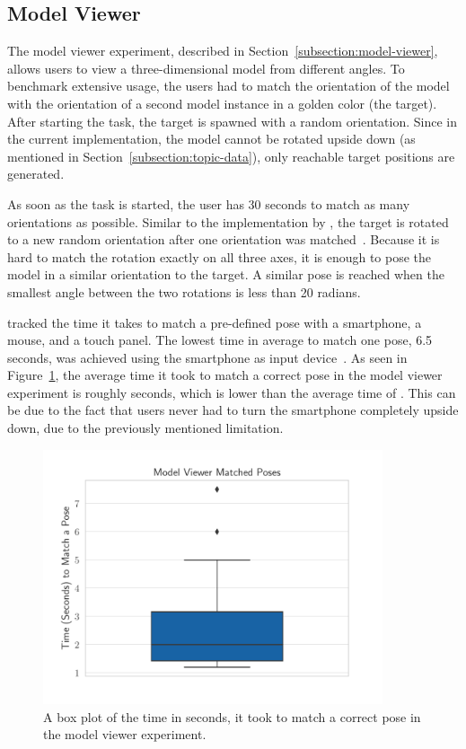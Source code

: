 \subsection{Model Viewer}\label{section:eval-res-mv}

The model viewer experiment, described in Section~\ref{subsection:model-viewer}, allows users to view a three-dimensional model from different angles. To benchmark extensive usage, the users had to match the orientation of the model with the orientation of a second model instance in a golden color (the target). After starting the task, the target is spawned with a random orientation.
Since in the current implementation, the model cannot be rotated upside down (as mentioned in Section~\ref{subsection:topic-data}), only reachable target positions are generated.

As soon as the task is started, the user has 30 seconds to match as many orientations as possible. Similar to the implementation by \citeauthor{Katzakis.2010}, the target is rotated to a new random orientation after one orientation was matched~\cite[140]{Katzakis.2010}.
Because it is hard to match the rotation exactly on all three axes, it is enough to pose the model in a similar orientation to the target. A similar pose is reached when the smallest angle between the two rotations is less than 20 radians.

\citeauthor{Katzakis.2010} tracked the time it takes to match a pre-defined pose with a smartphone, a mouse, and a touch panel. The lowest time in average to match one pose, 6.5 seconds, was achieved using the smartphone as input device~\cite[140]{Katzakis.2010}. As seen in Figure~\ref{fig:eval-exp-mv}, the average time it took to match a correct pose in the model viewer experiment is roughly \evalExpMvAvgPoses{} seconds, which is lower than the average time of \citeauthor{Katzakis.2010}. This can be due to the fact that users never had to turn the smartphone completely upside down, due to the previously mentioned limitation.

\begin{figure}[H]
	\centering
	\includegraphics[width=10cm]{figures/evaluation/eval_exp_mv.pdf}
	\caption[Model viewer task results]{A box plot of the time in seconds, it took to match a correct pose in the model viewer experiment.}\label{fig:eval-exp-mv}
\end{figure}


